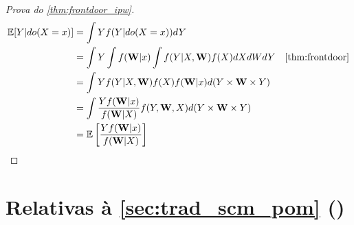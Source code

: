 \begin{proof}[Prova do \cref{thm:frontdoor_ipw}]
 \begin{align*}
  \E[Y|do(X=x)]
  &= \int Y f(Y|do(X=x)) dY \\
  &= \int Y \int f(\W|x) \int f(Y|X,\W)f(X)dXdWdY 
  & \text{\cref{thm:frontdoor}} \\
  &= \int Y f(Y|X,\W)f(X) f(\W|x) d(Y \times \W \times Y) \\
  &= \int \frac{Y f(\W|x)}{f(\W|X)} f(Y,\W,X) d(Y \times \W \times Y) \\
  &= \E\left[\frac{Y f(\W|x)}{f(\W|X)} \right]
 \end{align*}
\end{proof}

\section{Relativas à \cref{sec:trad_scm_pom} ()}

